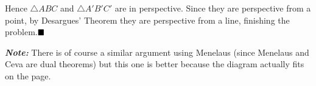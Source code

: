 \documentclass[12pt]{article}
\begin{document}
\begin{enumerate}
Hence $\triangle ABC$ and $\triangle A'B'C'$ are in perspective. Since they are perspective from a point, by Desargues' Theorem they are perspective from a line, finishing the problem.$\hfill\blacksquare$

\textit{\textbf{Note:}} There is of course a similar argument using Menelaus (since Menelaus and Ceva are dual theorems) but this one is better because the diagram actually fits on the page.
\end{enumerate}
\end{document}

